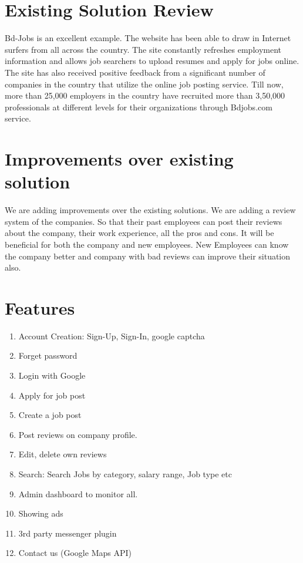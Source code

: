 \documentclass[11pt]{report}
\begin{document}
\section*{Existing Solution Review}

Bd-Jobs is an excellent example. The website has been able to draw in Internet surfers from all across the country. The site constantly refreshes employment information and allows job searchers to upload resumes and apply for jobs online. The site has also received positive feedback from a significant number of companies in the country that utilize the online job posting service. Till now, more than 25,000 employers in the country have recruited more than 3,50,000 professionals at different levels for their organizations through Bdjobs.com 
service.

\section*{Improvements over existing solution}
We are adding improvements over the existing solutions. We are adding a review system of the companies. So that their past employees can post their reviews about the company, their work experience, all the pros and cons. It will be beneficial for both the company and new employees. New Employees can know the company better and company with bad reviews can improve their situation also.





\section*{Features}

\begin{enumerate}
\item Account Creation: Sign-Up, Sign-In, google captcha
\item Forget password
\item Login with Google
\item Apply for job post
\item Create a job post
\item Post reviews on company profile.
\item Edit, delete own reviews
\item Search: Search Jobs by category, salary range, Job type etc
\item Admin dashboard to monitor all.
\item Showing ads
\item 3rd party messenger plugin
\item Contact us (Google Maps API)

 
\end{enumerate}
\end{document}
